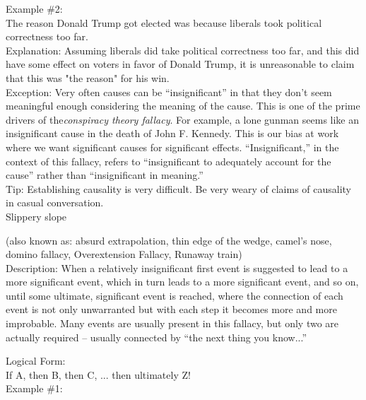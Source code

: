 \documentclass[a4paper,12pt,single,pdftex]{scrbook}
\begin{document}
    
      Example \#2:
    \\

    
      The reason Donald Trump got elected was because liberals took political correctness too far.
    \\

    
      Explanation: Assuming liberals did take political correctness too far, and this did have some effect on voters in favor of Donald Trump, it is unreasonable to claim that this was "the reason" for his win.
    \\

    
      Exception: Very often causes can be “insignificant” in that they don’t seem meaningful enough considering the meaning of the cause. This is one of the prime drivers of the{\em  {\it conspiracy theory}  fallacy}. For example, a lone gunman seems like an insignificant  cause in the death of John F. Kennedy. This is our bias at work where we want significant causes for significant effects. “Insignificant,” in the context of this fallacy, refers to “insignificant to adequately account for the cause” rather than “insignificant in meaning.”
    \\

    
      Tip: Establishing causality is very difficult. Be very weary of claims of causality in casual conversation.
    \\

  

Slippery slope
    
      (also known as: absurd extrapolation, thin edge of the wedge, camel's nose, domino fallacy, Overextension Fallacy, Runaway train)
    \\

  
    Description: When a relatively insignificant first event is suggested to lead to a more significant event, which in turn leads to a more significant event, and so on, until some ultimate, significant event is reached, where the connection of each event is not only unwarranted but with each step it becomes more and more improbable.  Many events are usually present in this fallacy, but only two are actually required -- usually connected by “the next thing you know...”

    
      Logical Form:
    \\

    
      If A, then B, then C, ... then ultimately Z!
    \\

    
      Example \#1:
    \\
\end{document}
